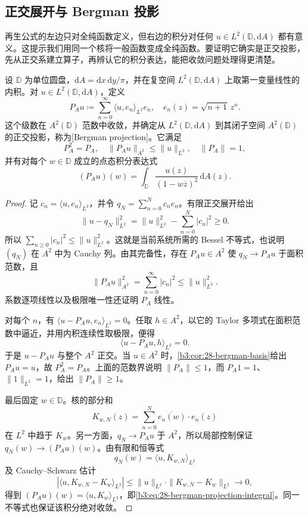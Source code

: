 \subsection{正交展开与 Bergman 投影}
\label{b3:subsec:280503}

再生公式的左边只对全纯函数定义，但右边的积分对任何 \(u\in L^2(\mathbb D,\mathrm{d}A)\) 都有意义。这提示我们用同一个核将一般函数变成全纯函数。要证明它确实是正交投影，先从正交系建立算子，再辨认它的积分表达，能把收敛问题处理得更清楚。

\begin{theorem}[Bergman 投影]\label{b3:thm:28-bergman-projection}
设 \(\mathbb D\) 为单位圆盘，\(\mathrm{d}A=\mathrm{d}x\,\mathrm{d}y/\pi\)，并在复空间 \(L^2(\mathbb D,\mathrm{d}A)\) 上取第一变量线性的内积。对 \(u\in L^2(\mathbb D,\mathrm{d}A)\)，定义
\begin{equation}\label{b3:eq:28-bergman-projection-series}
 P_Au\coloneqq\sum_{n=0}^{\infty}\langle u,e_n\rangle_{L^2}e_n,
 \quad e_n(z)=\sqrt{n+1}\,z^n.
\end{equation}
这个级数在 \(A^2(\mathbb D)\) 范数中收敛，并确定从 \(L^2(\mathbb D,\mathrm{d}A)\) 到其闭子空间 \(A^2(\mathbb D)\) 的正交投影，称为[Bergman projection]。它满足
\[
 P_A^2=P_A,
 \quad \|P_Au\|_{A^2}\le\|u\|_{L^2},
 \quad \|P_A\|=1,
\]
并有对每个 \(w\in\mathbb D\) 成立的点态积分表达式
\begin{equation}\label{b3:eq:28-bergman-projection-integral}
 (P_Au)(w)=\int_{\mathbb D}\frac{u(z)}{(1-w\overline z)^2}\,\mathrm{d}A(z).
\end{equation}
\end{theorem}
\begin{proof}
记 \(c_n=\langle u,e_n\rangle_{L^2}\)，并令 \(q_N=\sum_{n=0}^Nc_ne_n\)。有限正交展开给出
\[
 \|u-q_N\|_{L^2}^2
 =\|u\|_{L^2}^2-\sum_{n=0}^N|c_n|^2\ge0.
\]
所以 \(\sum_{n\ge0}|c_n|^2\le\|u\|_{L^2}^2\)。这就是当前系统所需的 Bessel 不等式，也说明 \((q_N)\) 在 \(A^2\) 中为 Cauchy 列。由其完备性，存在 \(P_Au\in A^2\) 使 \(q_N\to P_Au\) 于面积范数，且
\[
 \|P_Au\|_{A^2}^2=\sum_{n=0}^{\infty}|c_n|^2\le\|u\|_{L^2}^2.
\]
系数逐项线性以及极限唯一性还证明 \(P_A\) 线性。

对每个 \(n\)，有 \(\langle u-P_Au,e_n\rangle_{L^2}=0\)。任取 \(h\in A^2\)，以它的 Taylor 多项式在面积范数中逼近，并用内积连续性取极限，便得
\[
 \langle u-P_Au,h\rangle_{L^2}=0.
\]
于是 \(u-P_Au\) 与整个 \(A^2\) 正交。当 \(u\in A^2\) 时，\cref{b3:cor:28-bergman-basis}给出 \(P_Au=u\)，故 \(P_A^2=P_A\)。上面的范数界说明 \(\|P_A\|\le1\)，而 \(P_A1=1\)、\(\|1\|_{L^2}=1\)，给出 \(\|P_A\|\ge1\)。

最后固定 \(w\in\mathbb D\)。核的部分和
\[
 K_{w,N}(z)=\sum_{n=0}^N\overline{e_n(w)}\cdot e_n(z)
\]
在 \(L^2\) 中趋于 \(K_w\)。另一方面，\(q_N\to P_Au\) 于 \(A^2\)，所以局部控制保证 \(q_N(w)\to(P_Au)(w)\)。由有限和恒等式
\[
 q_N(w)=\langle u,K_{w,N}\rangle_{L^2}
\]
及 Cauchy--Schwarz 估计
\[
 |\langle u,K_{w,N}-K_w\rangle_{L^2}|
 \le\|u\|_{L^2}\cdot\|K_{w,N}-K_w\|_{L^2}\longrightarrow0,
\]
得到 \((P_Au)(w)=\langle u,K_w\rangle_{L^2}\)，即\eqref{b3:eq:28-bergman-projection-integral}。同一不等式也保证该积分绝对收敛。
\end{proof}

